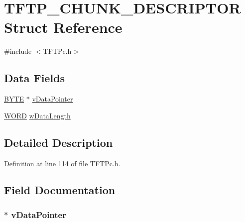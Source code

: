 \hypertarget{struct_t_f_t_p___c_h_u_n_k___d_e_s_c_r_i_p_t_o_r}{}\section{T\+F\+T\+P\+\_\+\+C\+H\+U\+N\+K\+\_\+\+D\+E\+S\+C\+R\+I\+P\+T\+O\+R Struct Reference}
\label{struct_t_f_t_p___c_h_u_n_k___d_e_s_c_r_i_p_t_o_r}


{\ttfamily \#include $<$T\+F\+T\+Pc.\+h$>$}

\subsection*{Data Fields}
\begin{DoxyCompactItemize}
\item 
\hyperlink{_generic_type_defs_8h_a4ae1dab0fb4b072a66584546209e7d58}{B\+Y\+T\+E} $\ast$ \hyperlink{struct_t_f_t_p___c_h_u_n_k___d_e_s_c_r_i_p_t_o_r_af5d213f6b404a845eabf11c203167052}{v\+Data\+Pointer}
\item 
\hyperlink{_generic_type_defs_8h_a2b0e863dadf920709ec53d9088ee7c91}{W\+O\+R\+D} \hyperlink{struct_t_f_t_p___c_h_u_n_k___d_e_s_c_r_i_p_t_o_r_a8edd715f61504cecee8a480602fabab4}{w\+Data\+Length}
\end{DoxyCompactItemize}


\subsection{Detailed Description}


Definition at line 114 of file T\+F\+T\+Pc.\+h.



\subsection{Field Documentation}
\hypertarget{struct_t_f_t_p___c_h_u_n_k___d_e_s_c_r_i_p_t_o_r_af5d213f6b404a845eabf11c203167052}{}
\subsubsection[{v\+Data\+Pointer}]{$\ast$ v\+Data\+Pointer}\label{struct_t_f_t_p___c_h_u_n_k___d_e_s_c_r_i_p_t_o_r_af5d213f6b404a845eabf11c203167052}


